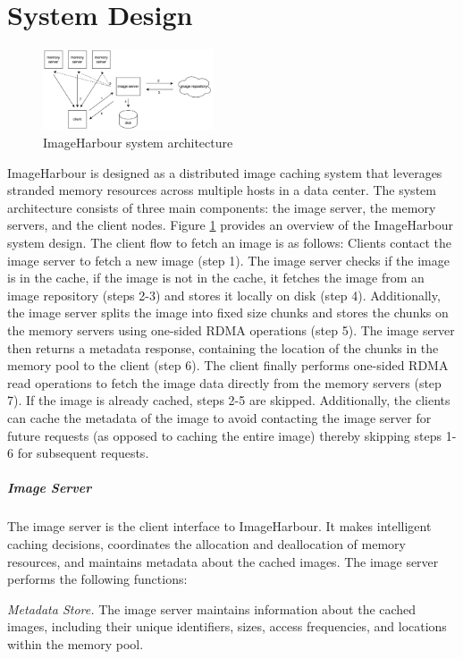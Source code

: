 \section{System Design}\label{sec:system_design}
\begin{figure}[h]
\centering
\includegraphics[width=0.45\textwidth]{flow.jpg}
\caption{ImageHarbour system architecture}
\label{fig:imageharbour_architecture}
\end{figure}
ImageHarbour is designed as a distributed image caching system that leverages stranded memory resources across multiple hosts in a data center. The system architecture consists of three main components: the image server, the memory servers, and the client nodes. Figure \ref{fig:imageharbour_architecture} provides an overview of the ImageHarbour system design. The client flow to fetch an image is as follows: Clients contact the image server to fetch a new image (step 1). The image server checks if the image is in the cache, if the image is not in the cache, it fetches the image from an image repository (steps 2-3) and stores it locally on disk (step 4). Additionally, the image server splits the image into fixed size chunks and stores the chunks on the memory servers using one-sided RDMA operations (step 5). The image server then returns a metadata response, containing the location of the chunks in the memory pool to the client (step 6). The client finally performs one-sided RDMA read operations to fetch the image data directly from the memory servers (step 7). If the image is already cached, steps 2-5 are skipped. Additionally, the clients can cache the metadata of the image to avoid contacting the image server for future requests (as opposed to caching the entire image) thereby skipping steps 1-6 for subsequent requests.

\subparagraph*{\textbf{Image Server}}
The image server is the client interface to ImageHarbour. It makes intelligent caching decisions, coordinates the allocation and deallocation of memory resources, and maintains metadata about the cached images. The image server performs the following functions:

\noindent\textit{Metadata Store.} The image server maintains information about the cached images, including their unique identifiers, sizes, access frequencies, and locations within the memory pool.

